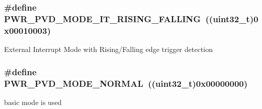 \subsubsection[{\texorpdfstring{P\+W\+R\+\_\+\+P\+V\+D\+\_\+\+M\+O\+D\+E\+\_\+\+I\+T\+\_\+\+R\+I\+S\+I\+N\+G\+\_\+\+F\+A\+L\+L\+I\+NG}{PWR_PVD_MODE_IT_RISING_FALLING}}]{\setlength{\rightskip}{0pt plus 5cm}\#define P\+W\+R\+\_\+\+P\+V\+D\+\_\+\+M\+O\+D\+E\+\_\+\+I\+T\+\_\+\+R\+I\+S\+I\+N\+G\+\_\+\+F\+A\+L\+L\+I\+NG~((uint32\+\_\+t)0x00010003)}\hypertarget{group___p_w_r___p_v_d___mode_gac531fbf14457e6595505354fad521b67}{}\label{group___p_w_r___p_v_d___mode_gac531fbf14457e6595505354fad521b67}
External Interrupt Mode with Rising/\+Falling edge trigger detection 
\subsubsection[{\texorpdfstring{P\+W\+R\+\_\+\+P\+V\+D\+\_\+\+M\+O\+D\+E\+\_\+\+N\+O\+R\+M\+AL}{PWR_PVD_MODE_NORMAL}}]{\setlength{\rightskip}{0pt plus 5cm}\#define P\+W\+R\+\_\+\+P\+V\+D\+\_\+\+M\+O\+D\+E\+\_\+\+N\+O\+R\+M\+AL~((uint32\+\_\+t)0x00000000)}\hypertarget{group___p_w_r___p_v_d___mode_ga3a4bf701a36a14a4edf4dc5a28153277}{}\label{group___p_w_r___p_v_d___mode_ga3a4bf701a36a14a4edf4dc5a28153277}
basic mode is used 